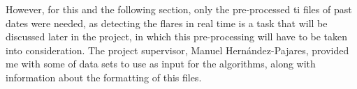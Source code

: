 However, for this and the following section, only the pre-processed ti files of past dates were needed, as detecting the flares in real time is a task that will be discussed later in the project, in which this pre-processing will have to be taken into consideration. The project supervisor, Manuel Hernández-Pajares, provided me with some of data sets to use as input for the algorithms, along with information about the formatting of this files.


